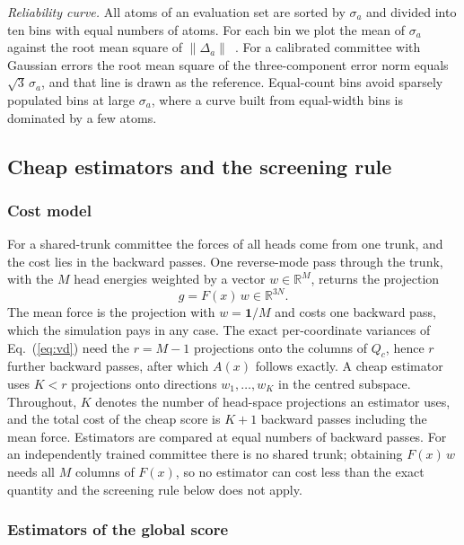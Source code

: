 \emph{Reliability curve.} All atoms of an evaluation set are sorted by
$\sigma_a$ and divided into ten bins with equal numbers of atoms. For each bin
we plot the mean of $\sigma_a$ against the root mean square of
$\lVert\Delta_a\rVert$~\citep{kahle2022quality,levi2022evaluating}. For a
calibrated committee with Gaussian errors the root mean square of the
three-component error norm equals $\sqrt{3}\,\sigma_a$, and that line is drawn
as the reference. Equal-count bins avoid sparsely populated bins at large
$\sigma_a$, where a curve built from equal-width bins is dominated by a few
atoms.

\subsection{Cheap estimators and the screening rule}
\label{sec:screening}

\subsubsection{Cost model}

For a shared-trunk committee the forces of all heads come from one trunk, and
the cost lies in the backward passes. One reverse-mode pass through the trunk,
with the $M$ head energies weighted by a vector $w\in\mathbb{R}^{M}$, returns
the projection
\begin{equation}
g=F(x)\,w\in\mathbb{R}^{3N}.
\label{eq:projection}
\end{equation}
The mean force is the projection with $w=\mathbf{1}/M$ and costs one backward
pass, which the simulation pays in any case. The exact per-coordinate variances
of Eq.~(\ref{eq:vd}) need the $r=M-1$ projections onto the columns of $Q_c$,
hence $r$ further backward passes, after which $A(x)$ follows exactly. A cheap
estimator uses $K<r$ projections onto directions $w_1,\dots,w_K$ in the centred
subspace. Throughout, $K$ denotes the number of head-space projections an
estimator uses, and the total cost of the cheap score is $K+1$ backward passes
including the mean force. Estimators are compared at equal numbers of backward
passes. For an independently trained committee there is no shared trunk;
obtaining $F(x)\,w$ needs all $M$ columns of $F(x)$, so no estimator can cost
less than the exact quantity and the screening rule below does not apply.

\subsubsection{Estimators of the global score}

